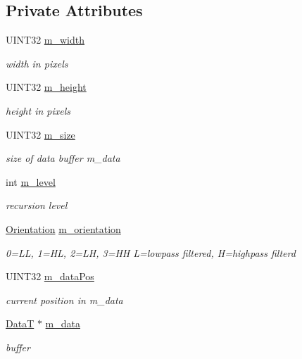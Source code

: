 \subsection*{Private Attributes}
\begin{DoxyCompactItemize}
\item 
U\+I\+N\+T32 \mbox{\hyperlink{classCSubband_af83106176dc938d0dcd45c155e93a7ed}{m\+\_\+width}}
\begin{DoxyCompactList}\small\item\em width in pixels \end{DoxyCompactList}\item 
U\+I\+N\+T32 \mbox{\hyperlink{classCSubband_a7c442889ba89b9b46af24392b9c65ee6}{m\+\_\+height}}
\begin{DoxyCompactList}\small\item\em height in pixels \end{DoxyCompactList}\item 
U\+I\+N\+T32 \mbox{\hyperlink{classCSubband_a1eca7bf4dad801599ffde81b9b25ab4d}{m\+\_\+size}}
\begin{DoxyCompactList}\small\item\em size of data buffer m\+\_\+data \end{DoxyCompactList}\item 
int \mbox{\hyperlink{classCSubband_a9deef80f2ba4a3d119411e96496987de}{m\+\_\+level}}
\begin{DoxyCompactList}\small\item\em recursion level \end{DoxyCompactList}\item 
\mbox{\hyperlink{PGFtypes_8h_a871118a09520247c78a71ecd7b0abd58}{Orientation}} \mbox{\hyperlink{classCSubband_a7fe0ebc633e4d07fa938a561a68f596f}{m\+\_\+orientation}}
\begin{DoxyCompactList}\small\item\em 0=LL, 1=HL, 2=LH, 3=HH L=lowpass filtered, H=highpass filterd \end{DoxyCompactList}\item 
U\+I\+N\+T32 \mbox{\hyperlink{classCSubband_a274d3cbc79f66725f961e3216b823167}{m\+\_\+data\+Pos}}
\begin{DoxyCompactList}\small\item\em current position in m\+\_\+data \end{DoxyCompactList}\item 
\mbox{\hyperlink{PGFtypes_8h_acb1ee3f52ccfad782dcaa0abd79e5d05}{DataT}} $\ast$ \mbox{\hyperlink{classCSubband_a8181f6adf76abb704ae8990843fdc2c4}{m\+\_\+data}}
\begin{DoxyCompactList}\small\item\em buffer \end{DoxyCompactList}\end{DoxyCompactItemize}

